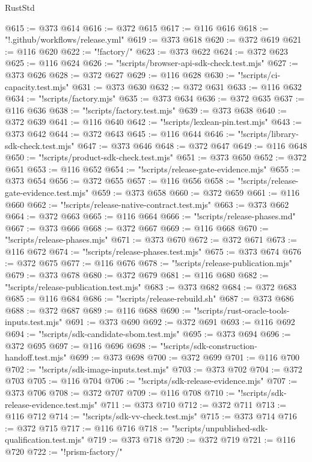 \begin{lexlean}{RustStd}
\begin{coremodule}
@615 := @373 @614
@616 := @372 @615
@617 := @116 @616
@618 := "!.github/workflows/release.yml"
@619 := @373 @618
@620 := @372 @619
@621 := @116 @620
@622 := "!factory/"
@623 := @373 @622
@624 := @372 @623
@625 := @116 @624
@626 := "!scripts/browser-api-sdk-check.test.mjs"
@627 := @373 @626
@628 := @372 @627
@629 := @116 @628
@630 := "!scripts/ci-capacity.test.mjs"
@631 := @373 @630
@632 := @372 @631
@633 := @116 @632
@634 := "!scripts/factory.mjs"
@635 := @373 @634
@636 := @372 @635
@637 := @116 @636
@638 := "!scripts/factory.test.mjs"
@639 := @373 @638
@640 := @372 @639
@641 := @116 @640
@642 := "!scripts/lexlean-pin.test.mjs"
@643 := @373 @642
@644 := @372 @643
@645 := @116 @644
@646 := "!scripts/library-sdk-check.test.mjs"
@647 := @373 @646
@648 := @372 @647
@649 := @116 @648
@650 := "!scripts/product-sdk-check.test.mjs"
@651 := @373 @650
@652 := @372 @651
@653 := @116 @652
@654 := "!scripts/release-gate-evidence.mjs"
@655 := @373 @654
@656 := @372 @655
@657 := @116 @656
@658 := "!scripts/release-gate-evidence.test.mjs"
@659 := @373 @658
@660 := @372 @659
@661 := @116 @660
@662 := "!scripts/release-native-contract.test.mjs"
@663 := @373 @662
@664 := @372 @663
@665 := @116 @664
@666 := "!scripts/release-phases.md"
@667 := @373 @666
@668 := @372 @667
@669 := @116 @668
@670 := "!scripts/release-phases.mjs"
@671 := @373 @670
@672 := @372 @671
@673 := @116 @672
@674 := "!scripts/release-phases.test.mjs"
@675 := @373 @674
@676 := @372 @675
@677 := @116 @676
@678 := "!scripts/release-publication.mjs"
@679 := @373 @678
@680 := @372 @679
@681 := @116 @680
@682 := "!scripts/release-publication.test.mjs"
@683 := @373 @682
@684 := @372 @683
@685 := @116 @684
@686 := "!scripts/release-rebuild.sh"
@687 := @373 @686
@688 := @372 @687
@689 := @116 @688
@690 := "!scripts/rust-oracle-tools-inputs.test.mjs"
@691 := @373 @690
@692 := @372 @691
@693 := @116 @692
@694 := "!scripts/sdk-candidate-sbom.test.mjs"
@695 := @373 @694
@696 := @372 @695
@697 := @116 @696
@698 := "!scripts/sdk-construction-handoff.test.mjs"
@699 := @373 @698
@700 := @372 @699
@701 := @116 @700
@702 := "!scripts/sdk-image-inputs.test.mjs"
@703 := @373 @702
@704 := @372 @703
@705 := @116 @704
@706 := "!scripts/sdk-release-evidence.mjs"
@707 := @373 @706
@708 := @372 @707
@709 := @116 @708
@710 := "!scripts/sdk-release-evidence.test.mjs"
@711 := @373 @710
@712 := @372 @711
@713 := @116 @712
@714 := "!scripts/sdk-vv-check.test.mjs"
@715 := @373 @714
@716 := @372 @715
@717 := @116 @716
@718 := "!scripts/unpublished-sdk-qualification.test.mjs"
@719 := @373 @718
@720 := @372 @719
@721 := @116 @720
@722 := "!prism-factory/"

\end{coremodule}
\end{lexlean}

